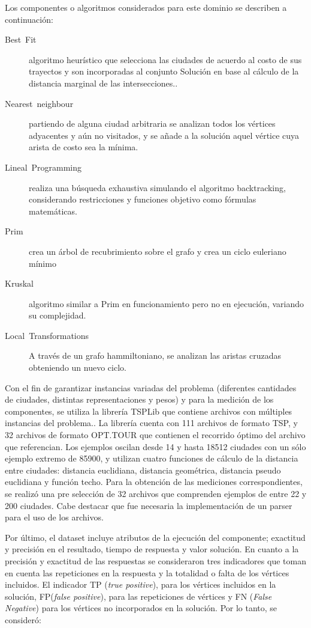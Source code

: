 Los componentes o algoritmos considerados para este dominio se describen
a continuación: 
\begin{description}
\item [{Best~Fit}] algoritmo heurístico que selecciona las ciudades de
acuerdo al costo de sus trayectos y son incorporadas al conjunto Solución
en base al cálculo de la distancia marginal de las intersecciones.. 
\item [{Nearest~neighbour}] partiendo de alguna ciudad arbitraria se analizan
todos los vértices adyacentes y aún no visitados, y se añade a la
solución aquel vértice cuya arista de costo sea la mínima. 
\item [{Lineal~Programming}] realiza una búsqueda exhaustiva simulando
el algoritmo backtracking, considerando restricciones y funciones
objetivo como fórmulas matemáticas. 
\item [{Prim}] crea un árbol de recubrimiento sobre el grafo y crea un
ciclo euleriano mínimo
\item [{Kruskal}] algoritmo similar a Prim en funcionamiento pero no en
ejecución, variando su complejidad.
\item [{Local~Transformations}] A través de un grafo hammiltoniano, se
analizan las aristas cruzadas obteniendo un nuevo ciclo.
\end{description}
Con el fin de garantizar instancias variadas del problema (diferentes
cantidades de ciudades, distintas representaciones y pesos) y para
la medición de los componentes, se utiliza la librería TSPLib que
contiene archivos con múltiples instancias del problema.. La librería
cuenta con 111 archivos de formato TSP, y 32 archivos de formato OPT.TOUR
que contienen el recorrido óptimo del archivo que referencian. Los
ejemplos oscilan desde 14 y hasta 18512 ciudades con un sólo ejemplo
extremo de 85900, y utilizan cuatro funciones de cálculo de la distancia
entre ciudades: distancia euclidiana, distancia geométrica, distancia
pseudo euclidiana y función techo. Para la obtención de las mediciones
correspondientes, se realizó una pre selección de 32 archivos que
comprenden ejemplos de entre 22 y 200 ciudades. Cabe destacar que
fue necesaria la implementación de un parser para el uso de los archivos. 

Por último, el dataset incluye atributos de la ejecución del componente;
exactitud y precisión en el resultado, tiempo de respuesta y valor
solución. En cuanto a la precisión y exactitud de las respuestas se
consideraron tres indicadores que toman en cuenta las repeticiones
en la respuesta y la totalidad o falta de los vértices incluidos.
El indicador TP (\emph{true positive}), para los vértices incluidos
en la solución, FP(\emph{false positive}), para las repeticiones de
vértices y FN (\emph{False Negative}) para los vértices no incorporados
en la solución. Por lo tanto, se consideró: 


